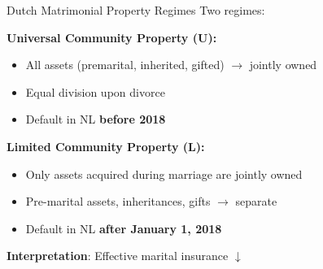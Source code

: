 \documentclass[aspectratio=169, 11pt]{beamer}
\newcommand{\highlight}[1]{\textcolor{blue!80!black}{\textbf{#1}}}
\begin{document}
\begin{frame}{Dutch Matrimonial Property Regimes}
Two regimes:
\vspace{0.3em}

\textbf{Universal Community Property (U):}
\begin{itemize}
  \item All assets (premarital, inherited, gifted) $\to$ jointly owned
  \item Equal division upon divorce %
  \item Default in NL \textbf{before 2018}
\end{itemize}
\vspace{0.4em}
\textbf{Limited Community Property (L):}
\begin{itemize}
  \item Only assets acquired during marriage are jointly owned
  \item Pre-marital assets, inheritances, gifts $\rightarrow$ separate
  \item Default in NL \textbf{after January 1, 2018}
\end{itemize}
\vspace{0.8em}

\highlight{Interpretation}: Effective marital insurance  $\downarrow$


\end{frame}
\end{document}
